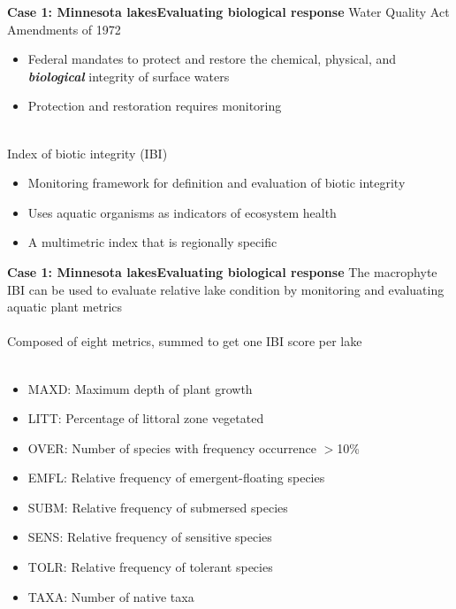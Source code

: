 \documentclass[serif]{beamer}\usepackage[]{graphicx}\usepackage[]{color}
\newcommand{\emtxt}[1]{\textbf{\textit{#1}}}
\begin{document}
\begin{frame}{\textbf{Case 1: Minnesota lakes}}{\textbf{Evaluating biological response}}
\onslide<+->
Water Quality Act Amendments of 1972
\begin{itemize}
\item{Federal mandates to protect and restore the chemical, physical, and \emtxt{biological} integrity of surface waters}
\item{Protection and restoration requires monitoring \\~\\}
\end{itemize}
\onslide<+->
Index of biotic integrity (IBI) \cite{Karr81,Karr86}
\begin{itemize}
\item{Monitoring framework for definition and evaluation of biotic integrity}
\item{Uses aquatic organisms as indicators of ecosystem health}
\item{A multimetric index that is regionally specific}
\end{itemize}
\end{frame}

\begin{frame}{\textbf{Case 1: Minnesota lakes}}{\textbf{Evaluating biological response}}
\onslide<+->
The macrophyte IBI can be used to evaluate relative lake condition by monitoring and evaluating aquatic plant metrics \cite{Beck10} \\~\\
\onslide<+->
Composed of eight metrics, summed to get one IBI score per lake \\~\\
\begin{itemize}
\item{MAXD: Maximum depth of plant growth}
\item{LITT: Percentage of littoral zone vegetated}
\item{OVER: Number of species with frequency occurrence $>$10\%}
\item{EMFL: Relative frequency of emergent-floating species}
\item{SUBM: Relative frequency of submersed species}
\item{SENS: Relative frequency of sensitive species}
\item{TOLR: Relative frequency of tolerant species}
\item{TAXA: Number of native taxa \\~\\}
\end{itemize}
\end{frame}
\end{document}
